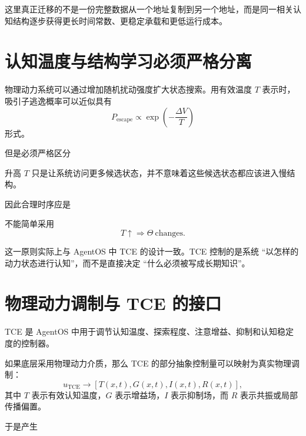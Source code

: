 这里真正迁移的不是一份完整数据从一个地址复制到另一个地址，而是同一相关认知结构逐步获得更长时间常数、更稳定承载和更低运行成本。

\section{认知温度与结构学习必须严格分离}

物理动力系统可以通过增加随机扰动强度扩大状态搜索。用有效温度 $T$ 表示时，吸引子逃逸概率可以近似具有
\[
P_{\mathrm{escape}}
\propto
\exp\left(
-\frac{\Delta V}{T}
\right)
\]
形式。

但是必须严格区分
\begin{statementbox}
\centering
{}
\end{statementbox}

升高 $T$ 只是让系统访问更多候选状态，并不意味着这些候选状态都应该进入慢结构。

因此合理时序应是
\begin{statementbox}
\centering
{}
\end{statementbox}

不能简单采用
\[
T\uparrow
\Rightarrow
\Theta\ \mathrm{changes}.
\]

这一原则实际上与 AgentOS 中 TCE 的设计一致。TCE 控制的是系统 ``以怎样的动力状态进行认知''，而不是直接决定 ``什么必须被写成长期知识''。

\section{物理动力调制与 TCE 的接口}

TCE 是 AgentOS 中用于调节认知温度、探索程度、注意增益、抑制和认知稳定度的控制器。

如果底层采用物理动力介质，那么 TCE 的部分抽象控制量可以映射为真实物理调制：
\[
u_{\mathrm{TCE}}
\rightarrow
[
T(x,t),
G(x,t),
I(x,t),
R(x,t)
],
\]
其中 $T$ 表示有效认知温度，$G$ 表示增益场，$I$ 表示抑制场，而 $R$ 表示共振或局部传播偏置。

于是产生
\begin{statementbox}
\centering
{}
\end{statementbox}

